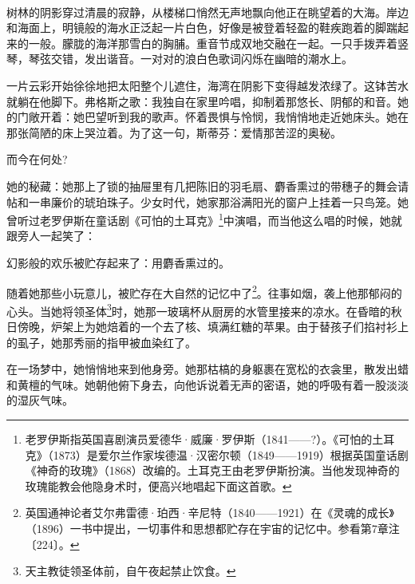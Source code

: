 \par 树林的阴影穿过清晨的寂静，从楼梯口悄然无声地飘向他正在眺望着的大海。岸边和海面上，明镜般的海水正泛起一片白色，好像是被登着轻盈的鞋疾跑着的脚踹起来的一般。朦胧的海洋那雪白的胸脯。重音节成双地交融在一起。一只手拨弄着竖琴，琴弦交错，发出谐音。一对对的浪白色歌词闪烁在幽暗的潮水上。
\par 一片云彩开始徐徐地把太阳整个儿遮住，海湾在阴影下变得越发浓绿了。这钵苦水就躺在他脚下。弗格斯之歌：我独自在家里吟唱，抑制着那悠长、阴郁的和音。她的门敞开着：她巴望听到我的歌声。怀着畏惧与怜悯，我悄悄地走近她床头。她在那张简陋的床上哭泣着。为了这一句，斯蒂芬：爱情那苦涩的奥秘。
\par 而今在何处?
\par 她的秘藏：她那上了锁的抽屉里有几把陈旧的羽毛扇、麝香熏过的带穗子的舞会请帖和一串廉价的琥珀珠子。少女时代，她家那浴满阳光的窗户上挂着一只鸟笼。她曾听过老罗伊斯在童话剧《可怕的土耳克》\footnote{老罗伊斯指英国喜剧演员爱德华·威廉·罗伊斯（1841——?）。《可怕的土耳克》（1873）是爱尔兰作家埃德温·汉密尔顿（1849——1919）根据英国童话剧《神奇的玫瑰》（1868）改编的。土耳克王由老罗伊斯扮演。当他发现神奇的玫瑰能教会他隐身术时，便高兴地唱起下面这首歌。}中演唱，而当他这么唱的时候，她就跟旁人一起笑了：
\par 幻影般的欢乐被贮存起来了：用麝香熏过的。
\par 随着她那些小玩意儿，被贮存在大自然的记忆中了\footnote{英国通神论者艾尔弗雷德·珀西·辛尼特（1840——1921）在《灵魂的成长》（1896）一书中提出，一切事件和思想都贮存在宇宙的记忆中。参看第7章注〔224〕。}。往事如烟，袭上他那郁闷的心头。当她将领圣体\footnote{天主教徒领圣体前，自午夜起禁止饮食。}时，她那一玻璃杯从厨房的水管里接来的凉水。在昏暗的秋日傍晚，炉架上为她焙着的一个去了核、填满红糖的苹果。由于替孩子们掐衬衫上的虱子，她那秀丽的指甲被血染红了。
\par 在一场梦中，她悄悄地来到他身旁。她那枯槁的身躯裹在宽松的衣衾里，散发出蜡和黄檀的气味。她朝他俯下身去，向他诉说着无声的密语，她的呼吸有着一股淡淡的湿灰气味。
